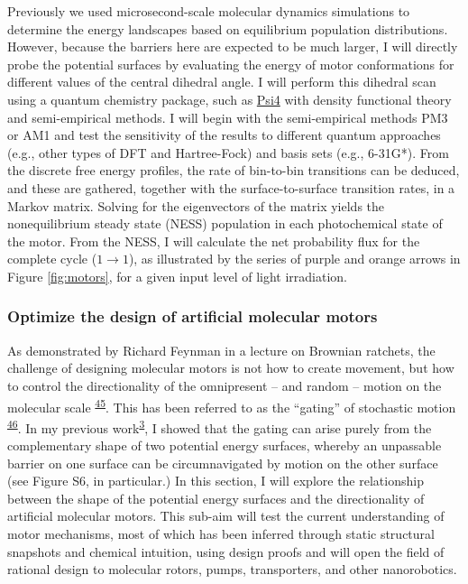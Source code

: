 \documentclass[11pt,notitlepage]{article}
\providecommand{\DIFaddbegin}{} %
\providecommand{\DIFaddend}{} %
\providecommand{\DIFdelbegin}{} %
\providecommand{\DIFdelend}{} %
\newcommand{\DIFscaledelfig}{0.5}
\newlength{\DIFdelgraphicswidth} %
\newlength{\DIFdelgraphicsheight} %
\newcommand{\DIFaddincludegraphics}[2][]{{\color{blue}\fbox{\DIFOincludegraphics[#1]{#2}}}} %
\newcommand{\DIFdelincludegraphics}[2][]{%
\sbox{\DIFdelgraphicsbox}{\DIFOincludegraphics[#1]{#2}}%
\settoboxwidth{\DIFdelgraphicswidth}{\DIFdelgraphicsbox} %
\settoboxtotalheight{\DIFdelgraphicsheight}{\DIFdelgraphicsbox} %
\scalebox{\DIFscaledelfig}{%
\parbox[b]{\DIFdelgraphicswidth}{\usebox{\DIFdelgraphicsbox}\\[-\baselineskip] \rule{\DIFdelgraphicswidth}{0em}}\llap{\resizebox{\DIFdelgraphicswidth}{\DIFdelgraphicsheight}{%
\setlength{\unitlength}{\DIFdelgraphicswidth}%
\begin{picture}(1,1)%
\thicklines\linethickness{2pt} %
{\color[rgb]{1,0,0}\put(0,0){\framebox(1,1){}}}%
{\color[rgb]{1,0,0}\put(0,0){\line( 1,1){1}}}%
{\color[rgb]{1,0,0}\put(0,1){\line(1,-1){1}}}%
\end{picture}%
}\hspace*{3pt}}} %
} %
\DeclareRobustCommand{\DIFaddbegin}{\DIFOaddbegin \let\includegraphics\DIFaddincludegraphics} %
\DeclareRobustCommand{\DIFaddend}{\DIFOaddend \let\includegraphics\DIFOincludegraphics} %
\DeclareRobustCommand{\DIFdelbegin}{\DIFOdelbegin \let\includegraphics\DIFdelincludegraphics} %
\DeclareRobustCommand{\DIFdelend}{\DIFOaddend \let\includegraphics\DIFOincludegraphics} %
\begin{document}
Previously we used microsecond-scale molecular dynamics simulations to
determine the energy landscapes based on equilibrium population
distributions. However, because the barriers here are expected to be
much larger, I will directly probe the potential surfaces by evaluating
the energy of motor conformations for different values of the central
dihedral angle. I will perform this dihedral scan using a quantum
chemistry package, such as \href{http://psicode.org/}{Psi4} with density
functional theory and semi-empirical methods. I will begin with the
semi-empirical methods PM3 or AM1 and test the sensitivity of the
results to different quantum approaches (e.g., other types of DFT and
Hartree-Fock) and basis sets (e.g., 6-31G*). From the discrete free
energy profiles, the rate of bin-to-bin transitions can be deduced, and
these are gathered, together with the surface-to-surface transition
rates, in a Markov matrix. Solving for the eigenvectors of the matrix
yields the nonequilibrium steady state (NESS) population in each
photochemical state of the motor. From the NESS, I will calculate the
net probability flux for the complete cycle (\(1 \rightarrow 1\)), as
illustrated by the series of purple and orange arrows in Figure
\ref{fig:motors}, for a given input level of light irradiation.

\hypertarget{optimize-the-design-of-artificial-molecular-motors}{%
\subsubsection{Optimize the design of artificial molecular
motors}\label{optimize-the-design-of-artificial-molecular-motors}}

As demonstrated by Richard Feynman in a lecture on Brownian ratchets,
the challenge of designing molecular motors is not how to create
movement, but how to control the directionality of the omnipresent --
and random -- motion on the molecular
scale\textsuperscript{\protect\DIFdelbegin %
\DIFdelend \DIFaddbegin \hyperlink{ref-10FsKpWBI}{45}\DIFaddend }. This has
been referred to as the ``gating'' of stochastic
motion\textsuperscript{\protect\DIFdelbegin %
\DIFdelend \DIFaddbegin \hyperlink{ref-qhUBHBOM}{46}\DIFaddend }. In my
previous work\textsuperscript{\protect\hyperlink{ref-1BfYw0gk2}{3}}, I
showed that the gating can arise purely from the complementary shape of
two potential energy surfaces, whereby an unpassable barrier on one
surface can be circumnavigated by motion on the other surface (see
Figure S6, in particular.) In this section, I will explore the
relationship between the shape of the potential energy surfaces and the
directionality of artificial molecular motors. This sub-aim will test
the current understanding of motor mechanisms, most of which has been
inferred through static structural snapshots and chemical intuition,
using design proofs and will open the field of rational design to
molecular rotors, pumps, transporters, and other nanorobotics.
\end{document}
